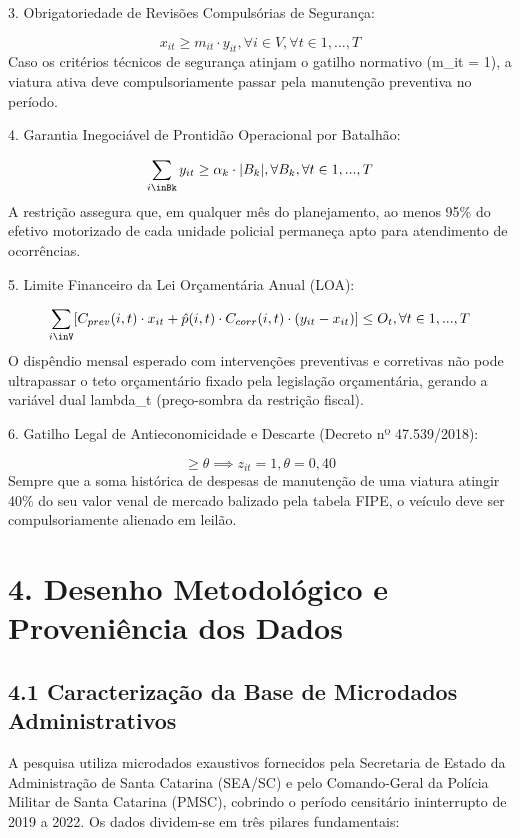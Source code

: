 \documentclass[10pt,a4paper,journal]{article}
\begin{document}
3. Obrigatoriedade de Revisões Compulsórias de Segurança:

\begin{equation}
x_{it} \ge m_{it} \cdot y_{it}, \forall i \in V, \forall t \in {1, ..., T} \label{eq:5}
\end{equation}
Caso os critérios técnicos de segurança atinjam o gatilho normativo (m\_it = 1), a viatura ativa deve compulsoriamente passar pela manutenção preventiva no período.

4. Garantia Inegociável de Prontidão Operacional por Batalhão:

\begin{equation}
\sum_{i\inBk} y_{it} \ge \alpha_{k} \cdot |B_{k}|, \forall B_{k}, \forall t \in {1, ..., T} \label{eq:6}
\end{equation}
A restrição assegura que, em qualquer mês do planejamento, ao menos 95\% do efetivo motorizado de cada unidade policial permaneça apto para atendimento de ocorrências.

5. Limite Financeiro da Lei Orçamentária Anual (LOA):

\begin{equation}
\sum_{i\inV} [ C_{prev}(i, t) \cdot x_{it} + \hat{p}(i, t) \cdot C_{corr}(i, t) \cdot (y_{it} - x_{it}) ] \le O_{t}, \forall t \in {1, ..., T} \label{eq:7}
\end{equation}
O dispêndio mensal esperado com intervenções preventivas e corretivas não pode ultrapassar o teto orçamentário fixado pela legislação orçamentária, gerando a variável dual lambda\_t (preço-sombra da restrição fiscal).

6. Gatilho Legal de Antieconomicidade e Descarte (Decreto nº 47.539/2018):

\begin{equation}
[ Gasto_Acumulado(i, t) / Valor_FIPE(i, t) ] \ge \theta \implies z_{it} = 1, \theta = 0,40 \label{eq:8}
\end{equation}
Sempre que a soma histórica de despesas de manutenção de uma viatura atingir 40\% do seu valor venal de mercado balizado pela tabela FIPE, o veículo deve ser compulsoriamente alienado em leilão.

\section{4. Desenho Metodológico e Proveniência dos Dados}
\subsection{4.1 Caracterização da Base de Microdados Administrativos}
A pesquisa utiliza microdados exaustivos fornecidos pela Secretaria de Estado da Administração de Santa Catarina (SEA/SC) e pelo Comando-Geral da Polícia Militar de Santa Catarina (PMSC), cobrindo o período censitário ininterrupto de 2019 a 2022. Os dados dividem-se em três pilares fundamentais:
\end{document}
